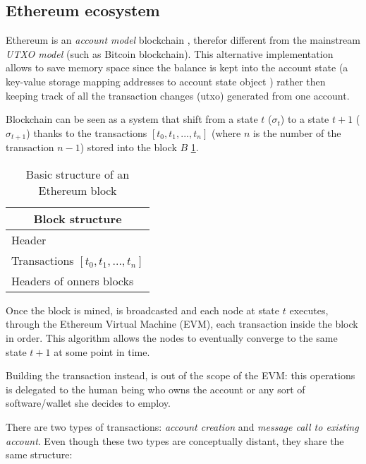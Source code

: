 \subsection{Ethereum ecosystem}

Ethereum is an \textit{account model} blockchain \cite{ethereum_whitepaper}, therefor different from the mainstream \textit{UTXO model}  (such as Bitcoin blockchain). This alternative implementation allows to save memory space since the balance is kept into the account state (a key-value storage mapping addresses to account state object \cite{ethereum_yellowpaper}) rather then keeping track of all the transaction changes (utxo) generated from one account.

Blockchain can be seen as a system that shift from a state $t$ ($\sigma_t$) to a state $t+1$ ($\sigma_{t+1}$) thanks to the transactions $[t_0,t_1,...,t_n]$ (where $n$ is the number of the transaction $n-1$) stored into the block $B$ \ref{table:2}.


\begin{table}[h!]
\centering
\begin{tabular}{ |p{3cm}|  }
\hline
\multicolumn{1}{|c|}{Block structure} \\
\hline
\hline
Header \\
\hline
Transactions $[t_0,t_1,...,t_n]$ \\
\hline
Headers of onners blocks\\
\hline
\end{tabular}
\caption{Basic structure of an Ethereum block}
\label{table:2}
\end{table}

Once the block is mined, is broadcasted and each node at state $t$  executes, through the Ethereum Virtual Machine (EVM), each transaction inside the block in order.
This algorithm allows the nodes to eventually converge to the same state $t+1$ at some point in time.

Building the transaction instead, is out of the scope of the EVM: this operations is delegated to the human being who owns the account or any sort of software/wallet she decides to employ.

There are two types of transactions: \textit{account creation} and \textit{message call to existing account}. Even though these two types are conceptually distant, they share the same structure:

